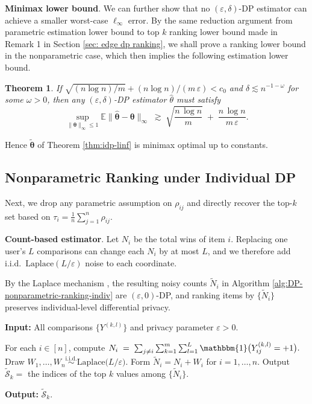 \documentclass[letterpaper,12pt]{article}
\numberwithin{equation}{section}
\theoremstyle{plain}
\newtheorem{Theorem}{Theorem}
\numberwithin{Theorem}{section}
\numberwithin{corollary}{section}
\numberwithin{proposition}{section}
\numberwithin{Lemma}{section}
{
	\theoremstyle{definition}
	\newtheorem{Definition}{Definition}
	\newtheorem{example}{Example}
	\numberwithin{example}{section}
	\newtheorem{fact}{Fact}
	\numberwithin{fact}{section}
	\newtheorem{remark}{Remark}
}
\newcommand{\1}{\mathbbm{1}}
\def\bth{{\boldsymbol{\theta}}}
\begin{document}
\noindent
\textbf{Minimax lower bound}.  
We can further show that no \((\varepsilon,\delta)\)-DP estimator can achieve a smaller worst-case \(\ell_{\infty}\) error.  By the same reduction argument from parametric estimation lower bound to top $k$ ranking lower bound made in Remark 1 in Section \ref{sec: edge dp ranking}, we shall prove a ranking lower bound in the nonparametric case, which then implies the following estimation lower bound.

\begin{Theorem}
	\label{thm: individual-privacy-lower}
	If \(\sqrt{(n\log n)/m} + (n\log n)/(m\,\varepsilon)<c_{0}\) and \(\delta\lesssim n^{-1-\omega}\) for some \(\omega>0\), then any \((\varepsilon,\delta)\)-DP estimator \(\widehat{\theta}\) must satisfy
$$
	\sup_{\|\bth\|_{\infty}\le1}
	\mathbb{E}\bigl\|\widehat{\bth}-\bth\bigr\|_{\infty}
	\;\gtrsim\;
	\sqrt{\frac{n\,\log n}{m}}
	\;+\;
	\frac{n\,\log n}{m\,\varepsilon}.
$$
\end{Theorem}
Hence $\widetilde{\bth}$ of Theorem \ref{thm:idp-linf} is minimax optimal up to constants.

\subsection{Nonparametric Ranking under Individual DP}
\label{sec: individual-nonparametric}

Next, we drop any parametric assumption on \(\rho_{ij}\) and directly recover the top-\(k\) set based on
$\tau_i = \frac{1}{n}\!\sum_{j=1}^n \rho_{ij}$.

\textbf{Count-based estimator}.  Let $N_i$ be the total wins of item \(i\).  Replacing one user's \(L\) comparisons can change each \(N_i\) by at most \(L\), and we therefore add i.i.d.\ \(\mathrm{Laplace}(L/\varepsilon)\) noise to each coordinate.

By the Laplace mechanism \cite{dwork2006calibrating}, the resulting noisy counts
\(\widetilde{N}_i\) in Algorithm \ref{alg:DP-nonparametric-ranking-indiv} are \((\varepsilon,0)\)-DP, and ranking items by \(\{\widetilde{N}_i\}\) preserves individual-level differential privacy.
\begin{algorithm}[!htbp]
	\caption{Individual-DP Top-\(k\) via Noisy Counts}
	\label{alg:DP-nonparametric-ranking-indiv}
	
	\textbf{Input:}  All comparisons \(\{Y^{(k,l)}\}\) and privacy parameter \(\varepsilon>0\).

	\begin{algorithmic}[1]
		\State For each \(i\in[n]\), compute
	$
		N_i \;=\; \sum_{j\neq i}\sum_{k=1}^m\sum_{l=1}^L \1\bigl(Y_{ij}^{(k,l)}=+1\bigr).
$
		\State Draw \(W_1,\dots,W_n\overset{\mathrm{i.i.d.}}{\sim}\mathrm{Laplace}\bigl(L/\varepsilon\bigr).\)
		\State Form \(\widetilde{N}_i = N_i + W_i\) for \(i=1,\dots,n\).
		\State Output \(\widetilde{\mathcal{S}}_k =\) the indices of the top \(k\) values among \(\{\widetilde{N}_i\}\).
	\end{algorithmic}
	
	\textbf{Output:}  \(\widetilde{\mathcal{S}}_k\).
\end{algorithm}
\end{document}
